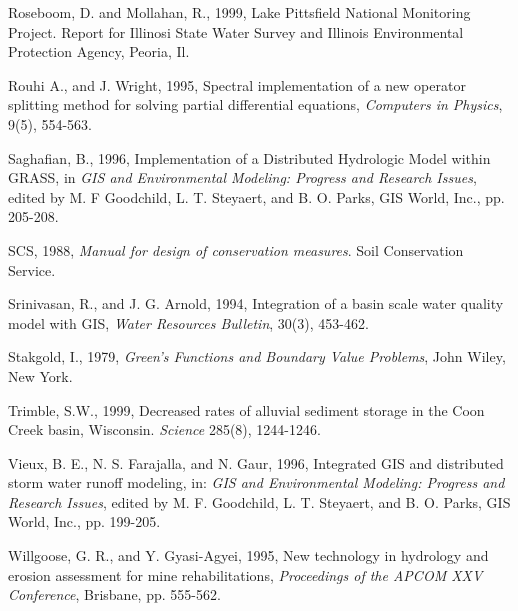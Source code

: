 \documentclass{kapedbk} %
\begin{document}
\begin{chapthebibliography}{1}
{%

\bibitem{}
Roseboom, D. and Mollahan, R., 1999, Lake Pittsfield National Monitoring Project. 
Report for Illinosi State Water Survey and Illinois Environmental Protection
Agency, Peoria, Il.  

\bibitem{} 
Rouhi A., and J. Wright, 1995, Spectral implementation of a new operator splitting
method for solving partial differential equations, {\it Computers in Physics}, 9(5), 
554-563.

\bibitem{}
Saghafian, B., 1996, Implementation of a Distributed Hydrologic Model within GRASS, 
in {\it GIS and Environmental Modeling: Progress and Research Issues}, 
edited by M. F Goodchild, L. T. Steyaert, and B. O. Parks, GIS World, Inc., pp. 205-208.

\bibitem{}
SCS, 1988, {\it Manual for design of conservation measures}. Soil Conservation Service.


\bibitem{}
Srinivasan, R., and J. G. Arnold, 1994, Integration of a basin scale water quality model with GIS, 
{\it Water Resources Bulletin}, 30(3), 453-462.

\bibitem{} Stakgold, I., 1979, {\it Green's Functions and Boundary Value Problems},
John Wiley, New York.

\bibitem{}
Trimble, S.W., 1999, Decreased rates of alluvial sediment storage in
the Coon Creek basin, Wisconsin. {\it Science} 285(8), 1244-1246. 

\bibitem{}
Vieux, B. E., N. S. Farajalla, and N. Gaur, 1996,
 Integrated GIS and distributed storm 
water runoff modeling, in: {\it GIS and Environmental Modeling: 
Progress and Research Issues}, edited by M. F. Goodchild, L. T. Steyaert, 
and B. O. Parks, GIS World, Inc., pp. 199-205.



\bibitem{}
Willgoose, G. R., and Y. Gyasi-Agyei, 1995, New technology in hydrology and erosion 
assessment for mine rehabilitations, {\it Proceedings of the APCOM XXV Conference}, 
Brisbane, pp. 555-562.

}
\end{chapthebibliography}
\end{document}
